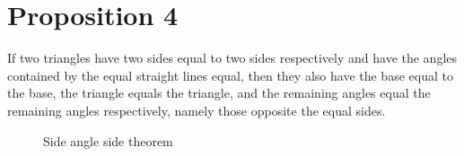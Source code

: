 

\section*{Proposition 4}

\begin{thm}
If two triangles have two sides equal to two sides respectively and have the angles contained by the equal straight lines equal, then they also have the base equal to the base, the triangle equals the triangle, and the remaining angles equal the remaining angles respectively, namely those opposite the equal sides.
\end{thm}

\begin{figure}[H]
\centering
	\begin{subfigure}{0.4\textwidth}
		\caption{}
	\end{subfigure}
	\begin{subfigure}{0.4\textwidth}
		\caption{}
	\end{subfigure}
	\caption{Side angle side theorem}
\end{figure}

